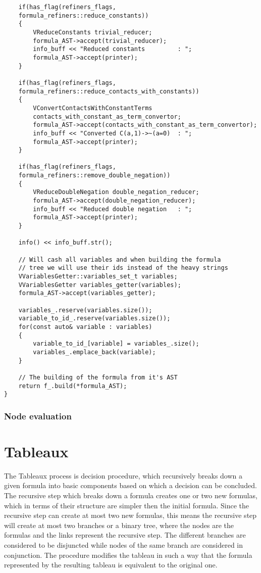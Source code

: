 \documentclass{article}
\begin{document}
\begin{lstlisting}
    if(has_flag(refiners_flags, 
	formula_refiners::reduce_constants))
    {
        VReduceConstants trivial_reducer;
        formula_AST->accept(trivial_reducer);
        info_buff << "Reduced constants         : ";
        formula_AST->accept(printer);
    }

    if(has_flag(refiners_flags, 
	formula_refiners::reduce_contacts_with_constants))
    {
        VConvertContactsWithConstantTerms 
		contacts_with_constant_as_term_convertor;
        formula_AST->accept(contacts_with_constant_as_term_convertor);
        info_buff << "Converted C(a,1)->~(a=0)  : ";
        formula_AST->accept(printer);
    }

    if(has_flag(refiners_flags, 
	formula_refiners::remove_double_negation))
    {
        VReduceDoubleNegation double_negation_reducer;
        formula_AST->accept(double_negation_reducer);
        info_buff << "Reduced double negation   : ";
        formula_AST->accept(printer);
    }

    info() << info_buff.str();

    // Will cash all variables and when building the formula 
    // tree we will use their ids instead of the heavy strings
    VVariablesGetter::variables_set_t variables;
    VVariablesGetter variables_getter(variables);
    formula_AST->accept(variables_getter);

    variables_.reserve(variables.size());
    variable_to_id_.reserve(variables.size());
    for(const auto& variable : variables)
    {
        variable_to_id_[variable] = variables_.size();
        variables_.emplace_back(variable);
    }

    // The building of the formula from it's AST
    return f_.build(*formula_AST); 
}
			\end{lstlisting}

	\subsubsection*{Node evaluation}



	\section{Tableaux}
	The Tableaux process is decision procedure, which recursively breaks down a given formula into basic components 
	based on which a decision can be concluded. The recursive step which breaks down a formula creates one or two 
	new formulas, which in terms of their structure are simpler then the initial formula. Since the recursive step can create
	at most two new formulas, this means the recursive step will create at most two branches or a binary tree, where the nodes
	are the formulas and the links represent the recursive step. The different branches are considered to be disjuncted while
   	nodes of the same branch are considered in conjunction. The procedure modifies the tableau in such a way that the 
	formula represented by the resulting tableau is equivalent to the original one.
\end{document}

